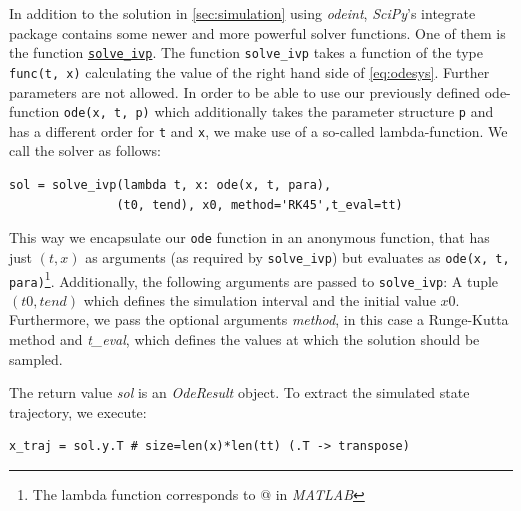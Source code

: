 \documentclass[a4paper,11pt,headings=standardclasses,parskip=half]{scrartcl}
\newcommand{\scipy}{\emph{SciPy}\xspace}
\begin{document}
In addition to the solution in \autoref{sec:simulation} using \emph{odeint}, \scipy's integrate package contains some newer and more powerful solver functions. One of them is the function \href{https://docs.scipy.org/doc/scipy/reference/generated/scipy.integrate.solve_ivp.html}{\texttt{solve\_ivp}}. The function \texttt{solve\_ivp} takes a function of the type \texttt{func(t, x)} calculating the value of the right hand side of \eqref{eq:odesys}. Further parameters are not allowed. In order to be able to use our previously defined ode-function \texttt{ode(x, t, p)} which additionally takes the parameter structure \texttt{p} and has a different order for \texttt{t}  and \texttt{x}, we make use of a so-called lambda-function. We call the solver as follows:
\begin{lstlisting}
sol = solve_ivp(lambda t, x: ode(x, t, para), 
               (t0, tend), x0, method='RK45',t_eval=tt)
\end{lstlisting}
This way we encapsulate our \texttt{ode} function in an anonymous function, that has just $(t, x)$ as arguments (as required by \texttt{solve\_ivp}) but evaluates as \texttt{ode(x, t, para)}\footnote{The lambda function corresponds to @ in \emph{MATLAB}}. Additionally, the following arguments are passed to \texttt{solve\_ivp}: A tuple $(t0, tend)$ which defines the simulation interval and the initial value $x0$. Furthermore, we pass the optional arguments \emph{method}, in this case a Runge-Kutta method and \emph{t\_eval}, which defines the values at which the solution should be sampled.

The return value \emph{sol} is an \emph{OdeResult} object. To extract the simulated state trajectory, we execute:
\begin{lstlisting}
x_traj = sol.y.T # size=len(x)*len(tt) (.T -> transpose)
\end{lstlisting}


\printglossaries
\end{document}
